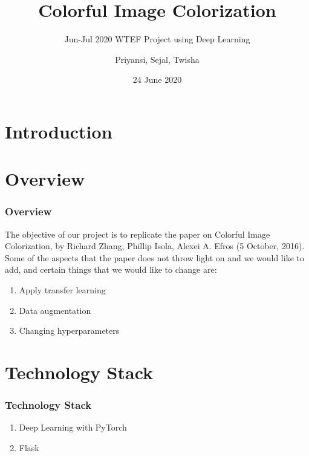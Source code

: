 \documentclass[16pt, subsection=false]{beamer}
\title{Colorful Image Colorization}
\subtitle{Jun-Jul 2020 WTEF Project using Deep Learning}
\author[Team 9]{Priyansi, Sejal, Twisha}
\date{24 June 2020}
\begin{document}
\section{Introduction}
\begin{frame}
	\titlepage
\end{frame}

\section{Overview}
\begin{frame}
	\frametitle{Overview}
	The objective of our project is to replicate the paper on Colorful Image Colorization, by Richard Zhang,
	Phillip Isola, Alexei A. Efros (5 October, 2016). \\
	Some of the aspects that the paper does not throw light on and we would like to add, and certain things that we
	would like to change are: \\
	\begin{enumerate}
		\item Apply transfer learning
		\item Data augmentation
		\item Changing hyperparameters
	\end{enumerate}
\end{frame}

\section{Technology Stack}
\begin{frame}
	\frametitle{Technology Stack}
	\begin{enumerate}
		\item Deep Learning with PyTorch \\
		\item Flask
	\end{enumerate}
\end{frame}
\end{document}
